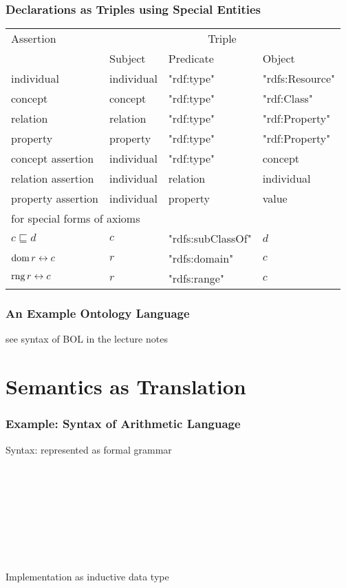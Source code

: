 \documentclass{beamer}
\begin{document}
\begin{frame}\frametitle{Declarations as Triples using Special Entities}
\begin{center}
\begin{tabular}{l|lll}
Assertion & \multicolumn{3}{c}{Triple} \\
          & Subject & Predicate & Object \\
\hline
individual & individual & "rdf:type" & "rdfs:Resource" \\
concept  & concept & "rdf:type" & "rdf:Class" \\
relation & relation & "rdf:type" & "rdf:Property" \\
property & property & "rdf:type" & "rdf:Property" \\
concept assertion  & individual & "rdf:type" & concept \\
relation assertion & individual & relation & individual \\
property assertion & individual & property & value \\
\hline
\multicolumn{4}{l}{for special forms of axioms}\\
$c\sqsubseteq d$ & $c$ & "rdfs:subClassOf" & $d$ \\
$\dom\,r\Equiv c$ & $r$ & "rdfs:domain" & $c$ \\
$\rng\, r\Equiv c$ & $r$ & "rdfs:range" & $c$ \\
\end{tabular}
\end{center}
\end{frame}

\begin{frame}\frametitle{An Example Ontology Language}
see syntax of BOL in the lecture notes
\end{frame}

\section{Semantics as Translation}

\begin{frame}\frametitle{Example: Syntax of Arithmetic Language}
Syntax: represented as formal grammar

\begin{commgrammar}
\\
\\
\\
\\
\\
\\
\\
\end{commgrammar}

Implementation as inductive data type
\end{frame}
\end{document}
